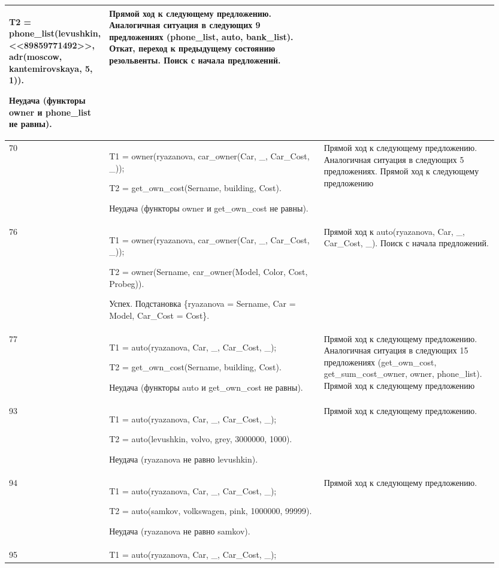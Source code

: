 \documentclass[a4paper,12pt]{article}
\begin{document}
\begin{center}
\begin{longtable}[h!]{|p{0.05\linewidth}|p{0.5\linewidth}|p{ 0.4\linewidth}|}
{				T2 =  phone\_list(levushkin, <<89859771492>>, adr(moscow, kantemirovskaya, 5, 1)).
				
				Неудача (функторы owner и phone\_list не равны).} & {Прямой ход к следующему предложению. Аналогичная ситуация в следующих 9 предложениях (phone\_list, auto, bank\_list). Откат, переход к предыдущему состоянию резольвенты. Поиск с начала предложений.}\\
			\hline
			{70} & {T1 = owner(ryazanova, car\_owner(Car, \_, Car\_Cost, \_));
				
				T2 = get\_own\_cost(Sername, building, Cost).
				
				Неудача (функторы owner и get\_own\_cost не равны).} & {Прямой ход к следующему предложению. Аналогичная ситуация в следующих 5 предложениях. Прямой ход к следующему предложению}\\
			\hline
			{76} & {T1 = owner(ryazanova, car\_owner(Car, \_, Car\_Cost, \_));
				
				T2 = owner(Sername, car\_owner(Model, Color, Cost, Probeg)).
				
				Успех. Подстановка \{ryazanova = Sername, Car = Model, Car\_Cost = Cost\}.} & {Прямой ход к auto(ryazanova, Car, \_, Car\_Cost, \_). Поиск с начала предложений.}\\
			\hline
			{77} & {T1 = auto(ryazanova, Car, \_, Car\_Cost, \_);
				
				T2 = get\_own\_cost(Sername, building, Cost).
				
				Неудача (функторы auto и get\_own\_cost не равны).} & {Прямой ход к следующему предложению. Аналогичная ситуация в следующих 15 предложениях (get\_own\_cost, get\_sum\_cost\_owner, owner, phone\_list). Прямой ход к следующему предложению}\\
			\hline
			{93} & {T1 = auto(ryazanova, Car, \_, Car\_Cost, \_);
				
				T2 = auto(levushkin, volvo, grey, 3000000, 1000).
				
				Неудача (ryazanova не равно levushkin).} & {Прямой ход к следующему предложению.}\\
			\hline
			{94} & {T1 = auto(ryazanova, Car, \_, Car\_Cost, \_);
				
				T2 = auto(samkov, volkswagen, pink, 1000000, 99999).
				
				Неудача (ryazanova не равно samkov).} & {Прямой ход к следующему предложению.}\\
			\hline
			{95} & {T1 = auto(ryazanova, Car, \_, Car\_Cost, \_);
				
}
\end{longtable}
\end{center}
\end{document}
